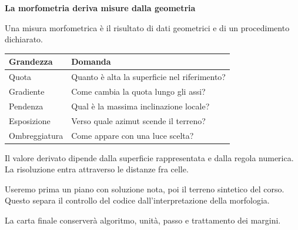\documentclass[12pt,aspectratio=1610]{beamer}
\newcommand{\PBody}[1]{\par{\fontsize{11.3}{14.8}\selectfont #1\par}}
\newcommand{\PSmall}[1]{\par{\fontsize{9.8}{13.1}\selectfont #1\par}}
\newcommand{\PInfo}[1]{%
\begin{tcolorbox}[enhanced,arc=1.6mm,boxrule=.55pt,colback=GeoTint,
 colframe=Rule!80!Classical,left=2.3mm,right=2.3mm,top=2mm,bottom=2mm,
 before skip=1mm,after skip=1mm]
\PSmall{#1}\end{tcolorbox}}
\begin{document}
\begin{frame}[plain]\hypertarget{slide49}{}
\begin{lrbox}{\TitleBox}
\begin{minipage}[t]{17.7cm}\raggedright\color{Ink}\fontsize{11.3}{14.8}\selectfont
\color{Navy}\bfseries\fontsize{20.6}{24.5}\selectfont La morfometria deriva misure dalla geometria
\end{minipage}\end{lrbox}

\begin{lrbox}{\RecallBox}
\begin{minipage}[t]{14.3cm}\raggedright\color{Ink}\fontsize{11.3}{14.8}\selectfont
\fontsize{10.3}{13.8}\selectfont Una misura morfometrica è il risultato di dati geometrici e di un procedimento dichiarato.
\end{minipage}\end{lrbox}

\begin{lrbox}{\PilotLeftBox}
\begin{minipage}[t]{10.05cm}\raggedright\color{Ink}\fontsize{11.3}{14.8}\selectfont
{\fontsize{10.2}{13.1}\selectfont\renewcommand{\arraystretch}{1.45}\begin{tabular}{@{}p{3.8cm}p{5.2cm}@{}}\toprule
\textbf{Grandezza} & \textbf{Domanda}\\\midrule
Quota & Quanto è alta la superficie nel riferimento?\\
Gradiente & Come cambia la quota lungo gli assi?\\
Pendenza & Qual è la massima inclinazione locale?\\
Esposizione & Verso quale azimut scende il terreno?\\
Ombreggiatura & Come appare con una luce scelta?\\
\bottomrule\end{tabular}}

\end{minipage}\end{lrbox}

\begin{lrbox}{\PilotRightBox}
\begin{minipage}[t]{7.55cm}\raggedright\color{Ink}\fontsize{11.3}{14.8}\selectfont
\PBody{Il valore derivato dipende dalla superficie rappresentata e dalla regola numerica. La risoluzione entra attraverso le distanze fra celle.}
\vspace{2.5mm}
\PInfo{Useremo prima un piano con soluzione nota, poi il terreno sintetico del corso. Questo separa il controllo del codice dall’interpretazione della morfologia.}
\PBody{La carta finale conserverà algoritmo, unità, passo e trattamento dei margini.}
\vspace{2.5mm}


\end{minipage}
\end{lrbox}
\end{frame}
\end{document}
